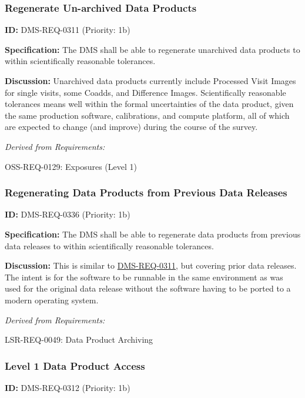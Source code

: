 \documentclass[SE,toc,lsstdraft]{lsstdoc}
\begin{document}
\subsubsection{Regenerate Un-archived Data Products}

\label{DMS-REQ-0311}
\textbf{ID:} DMS-REQ-0311 (Priority: 1b)

\textbf{Specification:} The DMS shall be able to regenerate unarchived data products to within scientifically reasonable tolerances.

\textbf{Discussion: }Unarchived data products currently include Processed Visit Images for single visits, some Coadds, and Difference Images. Scientifically reasonable tolerances means well within the formal uncertainties of the data product, given the same production software, calibrations, and compute platform, all of which are expected to change (and improve) during the course of the survey.

\emph{Derived from Requirements:}

OSS-REQ-0129:
Exposures (Level 1) \newline

\subsubsection{Regenerating Data Products from Previous Data Releases}

\label{DMS-REQ-0336}
\textbf{ID:} DMS-REQ-0336 (Priority: 1b)

\textbf{Specification:} The DMS shall be able to regenerate data products from previous data releases to within scientifically reasonable tolerances.

\textbf{Discussion:} This is similar to \hyperref[DMS-REQ-0311]{DMS-REQ-0311}, but covering prior data releases. The intent is for the software to be runnable in the same environment as was used for the original data release without the software having to be ported to a modern operating system.

\emph{Derived from Requirements:}

LSR-REQ-0049:
Data Product Archiving \newline

\subsubsection{Level 1 Data Product Access}

\label{DMS-REQ-0312}
\textbf{ID:} DMS-REQ-0312 (Priority: 1b)
\end{document}
